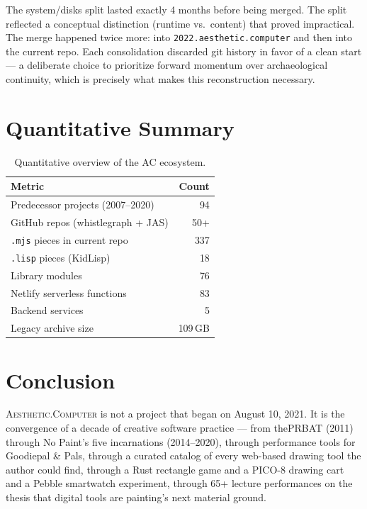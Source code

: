 \documentclass[10pt,letterpaper,twocolumn]{article}
\newcommand{\ac}{\textsc{Aesthetic.Computer}}
\begin{document}
The system/disks split lasted exactly 4 months before being merged. The split reflected a conceptual distinction (runtime vs.\ content) that proved impractical. The merge happened twice more: into \texttt{2022.aesthetic.computer} and then into the current repo. Each consolidation discarded git history in favor of a clean start --- a deliberate choice to prioritize forward momentum over archaeological continuity, which is precisely what makes this reconstruction necessary.


\section{Quantitative Summary}

\begin{table}[h]
\small
\centering
\begin{tabular}{lr}
\toprule
\textbf{Metric} & \textbf{Count} \\
\midrule
Predecessor projects (2007--2020) & 94 \\
GitHub repos (whistlegraph + JAS) & 50+ \\
\texttt{.mjs} pieces in current repo & 337 \\
\texttt{.lisp} pieces (KidLisp) & 18 \\
Library modules & 76 \\
Netlify serverless functions & 83 \\
Backend services & 5 \\
Legacy archive size & 109\,GB \\
\bottomrule
\end{tabular}
\caption{Quantitative overview of the AC ecosystem.}
\end{table}


\section{Conclusion}

\ac{} is not a project that began on August 10, 2021. It is the convergence of a decade of creative software practice --- from thePRBAT (2011) through No Paint's five incarnations (2014--2020), through performance tools for Goodiepal \& Pals, through a curated catalog of every web-based drawing tool the author could find, through a Rust rectangle game and a PICO-8 drawing cart and a Pebble smartwatch experiment, through 65+ lecture performances on the thesis that digital tools are painting's next material ground.
\end{document}
